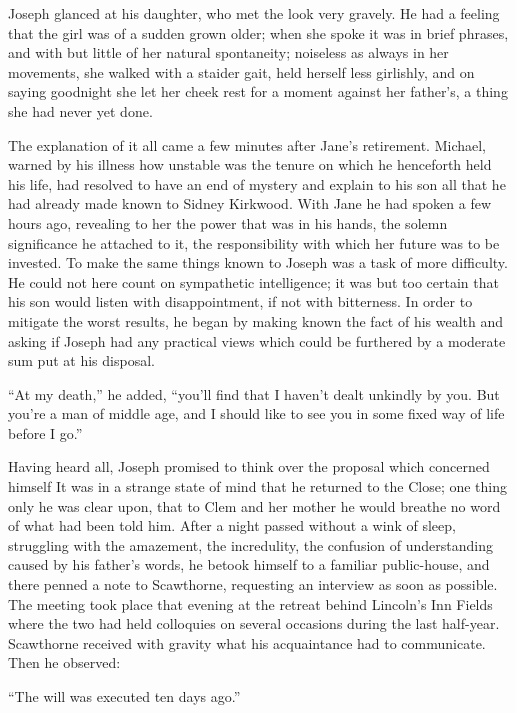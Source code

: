 Joseph glanced at his daughter, who met the look very gravely. He had a
feeling that the girl was of a sudden grown older; when she spoke it was
in brief phrases, and with but little of her natural spontaneity;
noiseless as always in her movements, she walked with a staider gait,
held herself less girlishly, and on saying goodnight she let her cheek
rest for a moment against her father's, a thing she had never yet done.

The explanation of it all came a few minutes after Jane's retirement.
Michael, warned by his illness how unstable was the tenure on which he
henceforth held his life, had resolved to have an end of mystery and
explain to his son all that he had already
{\protect\hypertarget{186}{}{}}made known to Sidney Kirkwood. With Jane
he had spoken a few hours ago, revealing to her the power that was in
his hands, the solemn significance he attached to it, the responsibility
with which her future was to be invested. To make the same things known
to Joseph was a task of more difficulty. He could not here count on
sympathetic intelligence; it was but too certain that his son would
listen with disappointment, if not with bitterness. In order to mitigate
the worst results, he began by making known the fact of his wealth and
asking if Joseph had any practical views which could be furthered by a
moderate sum put at his disposal.

``At my death,'' he added, ``you'll find that I haven't dealt unkindly
by you. But you're a man of middle age, and I should like to see you in
some fixed way of life before I go.''

Having heard all, Joseph promised to think over the proposal which
concerned himself It was in a strange state of mind that he returned to
the Close; one thing only he was clear upon, that to Clem and her mother
he {\protect\hypertarget{187}{}{}}would breathe no word of what had been
told him. After a night passed without a wink of sleep, struggling with
the amazement, the incredulity, the confusion of understanding caused by
his father's words, he betook himself to a familiar public-house, and
there penned a note to Scawthorne, requesting an interview as soon as
possible. The meeting took place that evening at the retreat behind
Lincoln's Inn Fields where the two had held colloquies on several
occasions during the last half-year. Scawthorne received with gravity
what his acquaintance had to communicate. Then he observed:

``The will was executed ten days ago.''

